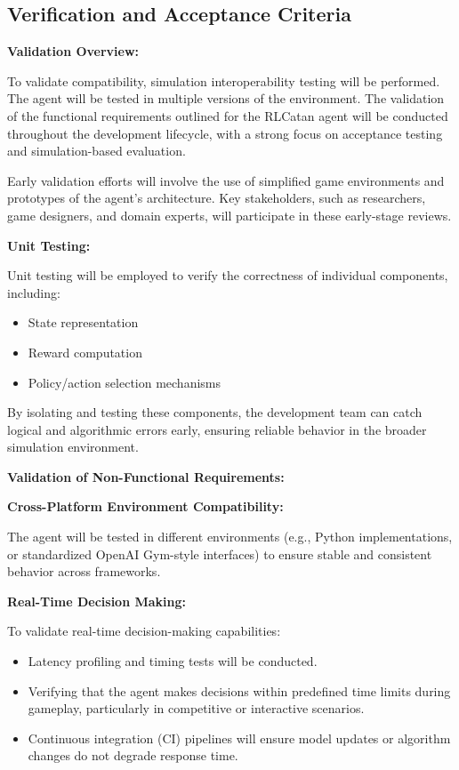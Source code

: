 \documentclass{article}
\begin{document}
\subsection{Verification and Acceptance Criteria}\label{subsec:verification-and-acceptance-criteria}

\noindent\textbf{Validation Overview:}

To validate compatibility, simulation interoperability testing will be performed. The \RL{} agent will be tested in multiple versions of the environment. The validation of the functional requirements outlined for the RLCatan agent will be conducted throughout the development lifecycle, with a strong focus on acceptance testing and simulation-based evaluation.

Early validation efforts will involve the use of simplified \emph{\Catan{}} game environments and prototypes of the \RL{} agent's architecture. Key stakeholders, such as \AI{} researchers, game designers, and domain experts, will participate in these early-stage reviews.

\noindent\textbf{Unit Testing:}

Unit testing will be employed to verify the correctness of individual components, including:
\begin{itemize}
    \item State representation
    \item Reward computation
    \item Policy/action selection mechanisms
\end{itemize}

By isolating and testing these components, the development team can catch logical and algorithmic errors early, ensuring reliable behavior in the broader simulation environment.

\noindent\textbf{Validation of Non-Functional Requirements:}

\noindent\textbf{Cross-Platform Environment Compatibility:}

The agent will be tested in different \emph{\Catan{}} environments (e.g., Python implementations, or standardized OpenAI Gym-style interfaces) to ensure stable and consistent behavior across frameworks.

\noindent\textbf{Real-Time Decision Making:}

To validate real-time decision-making capabilities:
\begin{itemize}
    \item Latency profiling and timing tests will be conducted.
    \item Verifying that the agent makes decisions within predefined time limits during gameplay, particularly in competitive or interactive scenarios.
    \item Continuous integration (CI) pipelines will ensure model updates or algorithm changes do not degrade response time.
\end{itemize}
\end{document}
